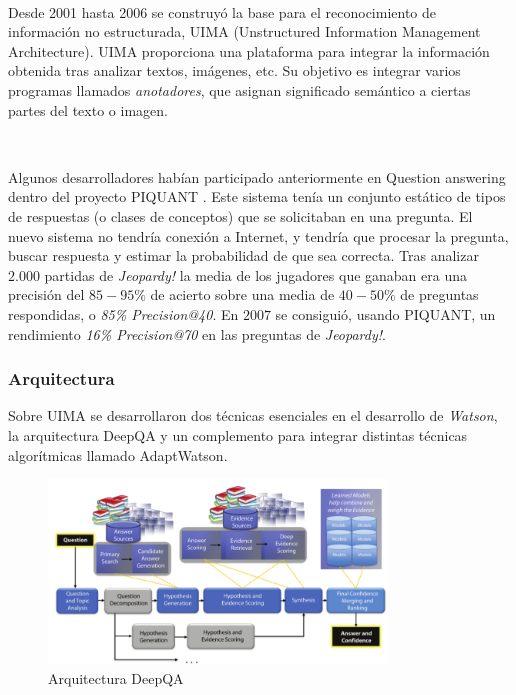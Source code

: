 \documentclass[paper=a4, fontsize=10pt]{scrartcl} %
\numberwithin{equation}{section} %
\numberwithin{figure}{section} %
\numberwithin{table}{section} %
\begin{document}
\

Desde 2001 hasta 2006 se construyó la base para el reconocimiento de información no estructurada, UIMA (Unstructured
Information Management Architecture). %
UIMA proporciona una plataforma para integrar la información obtenida tras analizar textos, imágenes, etc.
Su objetivo es integrar varios programas llamados \textit{anotadores}, que asignan significado semántico a ciertas partes del texto o imagen.

\

Algunos desarrolladores habían participado anteriormente en Question answering dentro del proyecto PIQUANT \cite{piquant}. %
Este sistema tenía un conjunto estático de tipos de respuestas (o clases de conceptos) que se solicitaban en una pregunta.
El nuevo sistema no tendría conexión a Internet, y tendría que procesar la pregunta, buscar respuesta y estimar la probabilidad de que sea correcta.
Tras analizar $2.000$ partidas de \textit{Jeopardy!} la media de los jugadores que ganaban era una precisión del $85-95\%$ de acierto sobre una media de $40-50\%$ de preguntas respondidas, o 
\textit{85\% Precision@40}.
En $2007$ se consiguió, usando PIQUANT, un rendimiento \textit{16\% Precision@70} en las preguntas de \textit{Jeopardy!}.


\subsubsection{Arquitectura}
Sobre UIMA se desarrollaron dos técnicas esenciales en el desarrollo de \textit{Watson}, la arquitectura DeepQA %
y un complemento para integrar distintas técnicas algorítmicas llamado AdaptWatson. %

\begin{figure}[H]
	\centering
	\label{tiw-deepqa}
	\includegraphics[width=0.8\textwidth]{./Imagenes/deepQA.png}
	\caption{Arquitectura DeepQA}
\end{figure}
\end{document}

